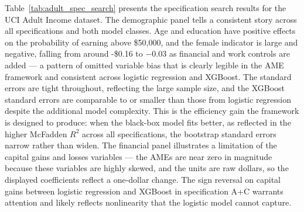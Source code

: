 \documentclass[12pt]{article}
\begin{document}
	Table~\ref{tab:adult_spec_search} presents the specification search results for the UCI Adult Income dataset. The demographic panel tells a consistent story across all specifications and both model classes. Age and education have positive effects on the probability of earning above \$50,000, and the female indicator is large and negative, falling from around -\$0.16 to $-$0.03 as financial and work controls are added --- a pattern of omitted variable bias that is clearly legible in the AME framework and consistent across logistic regression and XGBoost. The standard errors are tight throughout, reflecting the large sample size, and the XGBoost standard errors are comparable to or smaller than those from logistic regression despite the additional model complexity. This is the efficiency gain the framework is designed to produce: when the black-box model fits better, as reflected in the higher McFadden $R^2$ across all specifications, the bootstrap standard errors narrow rather than widen. The financial panel illustrates a limitation of the capital gains and losses variables --- the AMEs are near zero in magnitude because these variables are highly skewed, and the units are raw dollars, so the displayed coefficients reflect a one-dollar change. The sign reversal on capital gains between logistic regression and XGBoost in specification A+C warrants attention and likely reflects nonlinearity that the logistic model cannot capture.
	
\end{document}

